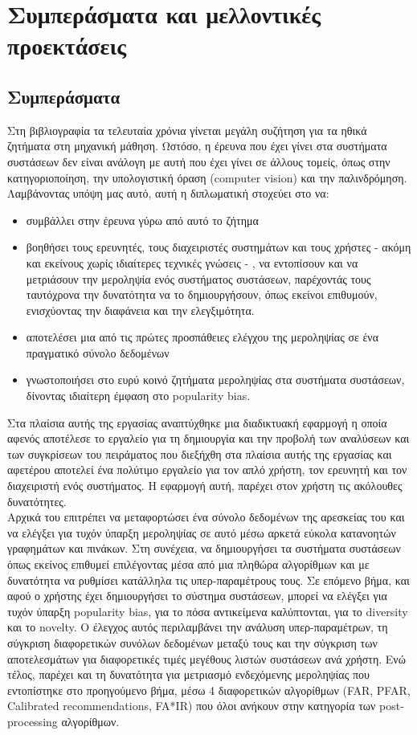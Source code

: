 \chapter{Συμπεράσματα και μελλοντικές προεκτάσεις}
\label{chap6}
\section{Συμπεράσματα}
\noindent Στη βιβλιογραφία τα τελευταία χρόνια γίνεται μεγάλη συζήτηση για τα ηθικά ζητήματα στη μηχανική μάθηση. Ωστόσο, η έρευνα που έχει γίνει στα συστήματα συστάσεων δεν είναι ανάλογη με αυτή που έχει γίνει σε άλλους τομείς, όπως στην κατηγοριοποίηση, την υπολογιστική όραση (computer vision) και την παλινδρόμηση. Λαμβάνοντας υπόψη μας αυτό, αυτή η διπλωματική στοχεύει στο να:
 \begin{itemize}
 	\item συμβάλλει στην έρευνα γύρω από αυτό το ζήτημα
 	\item βοηθήσει τους ερευνητές, τους διαχειριστές συστημάτων και τους χρήστες  - ακόμη και εκείνους χωρίς ιδιαίτερες τεχνικές γνώσεις - , να εντοπίσουν και να μετριάσουν την μεροληψία ενός συστήματος συστάσεων, παρέχοντάς τους ταυτόχρονα την δυνατότητα να το δημιουργήσουν, όπως εκείνοι επιθυμούν, ενισχύοντας την διαφάνεια και την ελεγξιμότητα.
 	\item αποτελέσει μια από τις πρώτες προσπάθειες ελέγχου της μεροληψίας σε ένα πραγματικό σύνολο δεδομένων
 	\item γνωστοποιήσει στο ευρύ κοινό ζητήματα μεροληψίας στα συστήματα συστάσεων, δίνοντας ιδιαίτερη έμφαση στο popularity bias.
 \end{itemize} 
Στα πλαίσια αυτής της εργασίας αναπτύχθηκε μια διαδικτυακή εφαρμογή η οποία αφενός αποτέλεσε το εργαλείο για τη δημιουργία και την προβολή των αναλύσεων και των συγκρίσεων του πειράματος που διεξήχθη στα πλαίσια αυτής της εργασίας και αφετέρου αποτελεί ένα πολύτιμο εργαλείο για τον απλό χρήστη, τον ερευνητή και τον διαχειριστή ενός συστήματος. Η εφαρμογή αυτή, παρέχει στον χρήστη τις ακόλουθες δυνατότητες.\\
Αρχικά του επιτρέπει να μεταφορτώσει ένα σύνολο δεδομένων της αρεσκείας του και να ελέγξει για τυχόν ύπαρξη μεροληψίας σε αυτό μέσω αρκετά εύκολα κατανοητών γραφημάτων και πινάκων. Στη συνέχεια, να δημιουργήσει τα συστήματα συστάσεων όπως εκείνος επιθυμεί επιλέγοντας μέσα από μια πληθώρα αλγορίθμων και με δυνατότητα να ρυθμίσει κατάλληλα τις υπερ-παραμέτρους τους. Σε επόμενο βήμα, και αφού ο χρήστης έχει δημιουργήσει το σύστημα συστάσεων, μπορεί να ελέγξει για τυχόν ύπαρξη popularity bias, για το πόσα αντικείμενα καλύπτονται, για το diversity και το novelty. Ο έλεγχος αυτός περιλαμβάνει την ανάλυση υπερ-παραμέτρων, τη σύγκριση διαφορετικών συνόλων δεδομένων μεταξύ τους και την σύγκριση των αποτελεσμάτων για διαφορετικές τιμές μεγέθους λιστών συστάσεων ανά χρήστη. Ενώ τέλος, παρέχει και τη δυνατότητα για μετριασμό ενδεχόμενης μεροληψίας που εντοπίστηκε στο προηγούμενο βήμα, μέσω 4 διαφορετικών αλγορίθμων (FAR, PFAR, Calibrated recommendations, FA*IR) που όλοι ανήκουν στην κατηγορία των post-processing αλγορίθμων.
